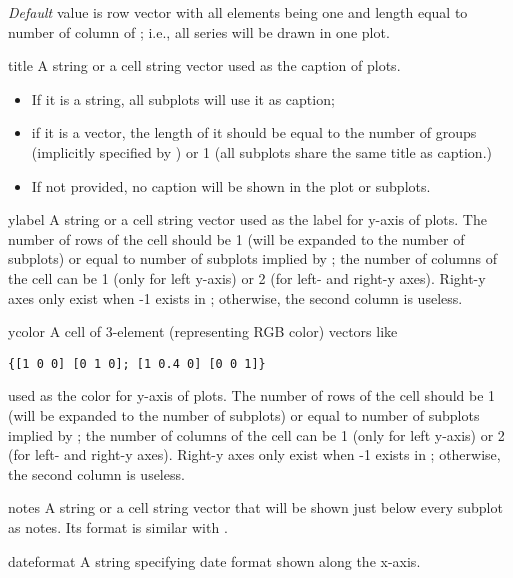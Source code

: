 \begin{argdesc}
\begin{argdesc}
\begin{lstlisting}[numbers=none]
  \end{lstlisting}
       \emph{Default} value 
       is row vector with all elements being one and length equal to number of column of ; 
       i.e., all series will be drawn in one plot.
      \item[title]      A string or a cell string vector used as the caption of plots.
                        \begin{itemize}
                         \item If it is a string, all subplots will use it as caption;
                         \item if it is a vector, the length of it should be equal to the number of groups (implicitly specified by )
                               or 1 (all subplots share the same title as caption.)
                         \item If not provided, no caption will be shown in the plot or subplots.
                        \end{itemize} 
      \item[ylabel]     A string or a cell string vector used as the label for y-axis of plots. 
	                    The number of rows of the cell should be 1 (will be expanded to the number of subplots) or equal to number of subplots implied by ;
						the number of columns of the cell can be 1 (only for left y-axis) or 2 (for left- and right-y axes).
						Right-y axes only exist when -1 exists in ; otherwise, the second column is useless.
      \item[ycolor]     A cell of 3-element (representing RGB color) vectors like 
  \begin{lstlisting}[numbers=none]	  
	  {[1 0 0] [0 1 0]; [1 0.4 0] [0 0 1]}
  \end{lstlisting}
	                    used as the color for y-axis of plots. 
	                    The number of rows of the cell should be 1 (will be expanded to the number of subplots) or equal to number of subplots implied by ;
						the number of columns of the cell can be 1 (only for left y-axis) or 2 (for left- and right-y axes).
						Right-y axes only exist when -1 exists in ; otherwise, the second column is useless.
      \item[notes]      A string or a cell string vector that will be shown just below every subplot as notes. 
                        Its format is similar with .
      \item[dateformat] A string specifying date format shown along the x-axis. 

\end{argdesc}
\end{argdesc}
